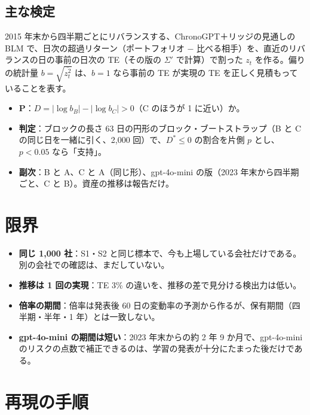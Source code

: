 \documentclass[xelatex,ja=standard,jafont=haranoaji,a4paper,10pt,openany]{bxjsreport}
\begin{document}
\section{主な検定}

2015 年末から四半期ごとにリバランスする、ChronoGPT＋リッジの見通しの BLM で、日次の超過リターン（ポートフォリオ − 比べる相手）を、直近のリバランスの日の事前の日次の TE（その版の $\Sigma'$ で計算）で割った $z_t$ を作る。偏りの統計量 $b = \sqrt{\overline{z_t^2}}$ は、$b = 1$ なら事前の TE が実現の TE を正しく見積もっていることを表す。

\begin{itemize}
\item \textbf{P}：$D = |\log b_B| - |\log b_C| > 0$（C のほうが 1 に近い）か。
\item \textbf{判定}：ブロックの長さ 63 日の円形のブロック・ブートストラップ（B と C の同じ日を一緒に引く、2,000 回）で、$D^* \leq 0$ の割合を片側 $p$ とし、$p < 0.05$ なら「支持」。
\item \textbf{副次}：B と A、C と A（同じ形）、gpt-4o-mini の版（2023 年末から四半期ごと、C と B）。資産の推移は報告だけ。
\end{itemize}



\chapter{限界}\label{ch:limits}

\begin{itemize}
\item \textbf{同じ 1,000 社}：S1・S2 と同じ標本で、今も上場している会社だけである。別の会社での確認は、まだしていない。
\item \textbf{推移は 1 回の実現}：TE 3\% の違いを、推移の差で見分ける検出力は低い。
\item \textbf{倍率の期間}：倍率は発表後 60 日の変動率の予測から作るが、保有期間（四半期・半年・1 年）とは一致しない。
\item \textbf{gpt-4o-mini の期間は短い}：2023 年末からの約 2 年 9 か月で、gpt-4o-mini のリスクの点数で補正できるのは、学習の発表が十分にたまった後だけである。
\end{itemize}

\chapter*{再現の手順}
\end{document}
